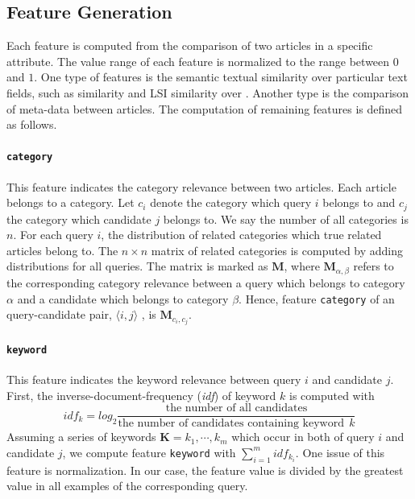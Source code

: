 \subsection{Feature Generation}
\label{sec:6.2}

Each feature is computed from the comparison of two articles in a specific attribute. The value range of each feature is normalized to the range between $0$ and $1$. One type of features is the semantic textual similarity over particular text fields, such as \tfidf{} similarity and LSI similarity over \icontent{}. Another type is the comparison of meta-data between articles. The computation of remaining features is defined as follows.

\paragraph{\texttt{category}}

This feature indicates the category relevance between two articles. Each article belongs to a category. Let $c_i$ denote the category which query $i$ belongs to and $c_j$ the category which candidate $j$ belongs to. We say the number of all categories is $n$. For each query $i$, the distribution of related categories which true related articles belong to. The $n\times n$ matrix of related categories is computed by adding distributions for all queries. The matrix is marked as $\mathbf{M}$, where $\mathbf{M}_{\alpha,\beta}$ refers to the corresponding category relevance between a query which belongs to category $\alpha$ and a candidate which belongs to category $\beta$. Hence, feature \texttt{category} of an query-candidate pair, $\langle i, j \rangle$ , is $\mathbf{M}_{c_i, c_j}$.

\paragraph{\texttt{keyword}}

This feature indicates the keyword relevance between query $i$ and candidate $j$. First, the inverse-document-frequency (\textit{idf}) of keyword $k$ is computed with $$idf_k=log_2 \dfrac{\text{the number of all candidates}}{\text{the number of candidates containing keyword}~~k}$$ Assuming a series of keywords $\mathbf{K}={k_1, \cdots, k_m}$ which occur in both of query $i$ and candidate $j$, we compute feature \texttt{keyword} with $\sum_{i=1}^{m} idf_{k_i}$. One issue of this feature is normalization. In our case, the feature value is divided by the greatest value in all examples of the corresponding query. 

